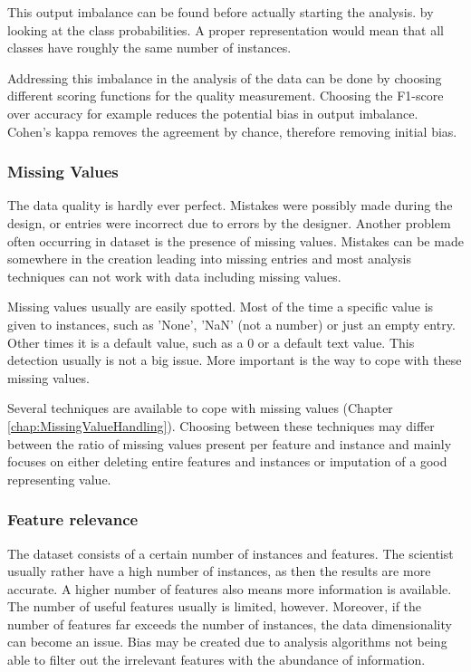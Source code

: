 \documentclass[10pt,a4paper]{report}
\begin{document}
	This output imbalance can be found before actually starting the analysis. by looking at the class probabilities. A proper representation would mean that all classes have roughly the same number of instances. 
	
	Addressing this imbalance in the analysis of the data can be done by choosing different scoring functions for the quality measurement. Choosing the F1-score over accuracy for example reduces the potential bias in output imbalance. Cohen's kappa removes the agreement by chance, therefore removing initial bias.
	
	\subsubsection{Missing Values}
	\label{DEsubsec:MissingValues}
	
	The data quality is hardly ever perfect. Mistakes were possibly made during the design, or entries were incorrect due to errors by the designer. Another problem often occurring in dataset is the presence of missing values. Mistakes can be made somewhere in the creation leading into missing entries and most analysis techniques can not work with data including missing values.
	
	Missing values usually are easily spotted. Most of the time a specific value is given to instances, such as 'None', 'NaN' (not a number) or just an empty entry. Other times it is a default value, such as a $0$ or a default text value. This detection usually is not a big issue. More important is the way to cope with these missing values.
	
	Several techniques are available to cope with missing values (Chapter \ref{chap:MissingValueHandling}). Choosing between these techniques may differ between the ratio of missing values present per feature and instance and mainly focuses on either deleting entire features and instances or imputation of a good representing value.
	
	\subsubsection{Feature relevance}
	\label{DEsubsec:FeatureSelection}
	
	The dataset consists of a certain number of instances and features. The scientist usually rather have a high number of instances, as then the results are more accurate. A higher number of features also means more information is available. The number of useful features usually is limited, however. Moreover, if the number of features far exceeds the number of instances, the data dimensionality can become an issue. Bias may be created due to analysis algorithms not being able to filter out the irrelevant features with the abundance of information.
	
\end{document}
